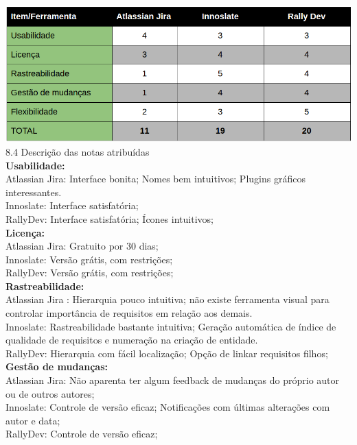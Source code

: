 {{\includegraphics[width=1\textwidth]{conteudo/resultados}\\

{\large{8.4 Descrição das notas atribuídas}}\\

\textbf{Usabilidade:}\\
	\tab Atlassian Jira: Interface bonita; Nomes bem intuitivos; Plugins gráficos interessantes.\\
	\tab Innoslate: Interface satisfatória; \\
	\tab RallyDev: Interface satisfatória; Ícones intuitivos;\\

\textbf{Licença:}\\
	\tab Atlassian Jira: Gratuito por 30 dias;\\
	\tab Innoslate: Versão grátis, com restrições;\\
	\tab RallyDev: Versão grátis, com restrições;\\

\textbf{Rastreabilidade:}\\
	\tab Atlassian Jira : Hierarquia pouco intuitiva; não existe ferramenta visual para controlar importância de requisitos em relação aos demais.\\
	\tab Innoslate: Rastreabilidade bastante intuitiva; Geração automática de índice de qualidade de requisitos e numeração na criação de entidade.\\
	\tab RallyDev: Hierarquia com fácil localização; Opção de linkar requisitos filhos;\\

\textbf{Gestão de mudanças:}\\
	\tab Atlassian Jira: Não aparenta ter algum feedback de mudanças do próprio autor ou de outros autores;\\
	\tab Innoslate: Controle de versão eficaz; Notificações com últimas alterações com autor e data;\\
	\tab RallyDev: Controle de versão eficaz;\\

}}

